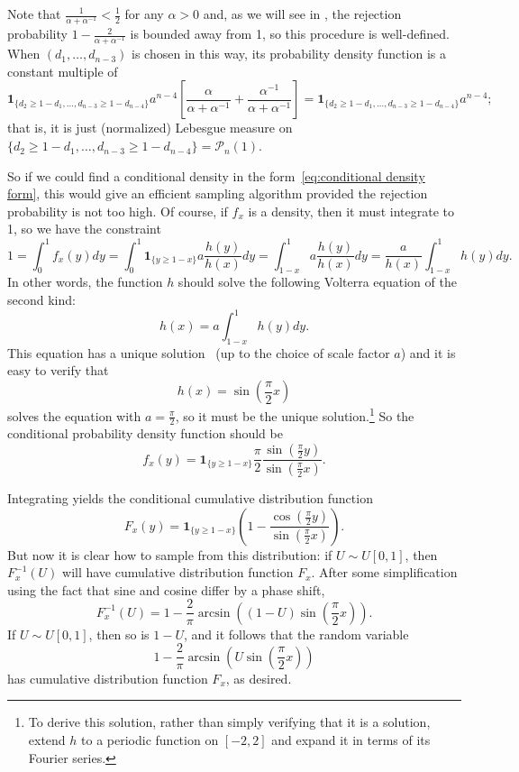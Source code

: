 \documentclass{article}
\theoremstyle{definition}
\newcommand{\one}{\mathbf{1}}
\begin{document}
Note that $\frac{1}{\alpha + \alpha^{-1}} < \frac{1}{2}$ for any $\alpha > 0$ and, as we will see in , the rejection probability $1-\frac{2}{\alpha + \alpha^{-1}}$ is bounded away from 1, so this procedure is well-defined. When $(d_1, \dots, d_{n-3})$ is chosen in this way, its probability density function is a constant multiple of
\[
	\one_{\{d_2 \geq 1-d_1,  \dots, d_{n-3} \geq 1-d_{n-4}\}} a^{n-4} \left[ \frac{\alpha}{\alpha + \alpha^{-1}} + \frac{\alpha^{-1}}{\alpha + \alpha^{-1}} \right] = \one_{\{d_2 \geq 1-d_1,  \dots, d_{n-3} \geq 1-d_{n-4}\}} a^{n-4} ;
\]
that is, it is just (normalized) Lebesgue measure on $\{d_2 \geq 1-d_1,  \dots, d_{n-3} \geq 1-d_{n-4}\} = \mathcal{P}_n(1)$.

So if we could find a conditional density in the form~\eqref{eq:conditional density form}, this would give an efficient sampling algorithm provided the rejection probability is not too high. Of course, if $f_x$ is a density, then it must integrate to 1, so we have the constraint
\[
	1 = \int_0^1 f_x(y) dy = \int_0^1 \one_{\{y \geq 1-x\}} a \frac{h(y)}{h(x)} dy = \int_{1-x}^1 a \frac{h(y)}{h(x)} dy = \frac{a}{h(x)} \int_{1-x}^1 h(y) dy.
\]
In other words, the function $h$ should solve the following Volterra equation of the second kind:
\[
	h(x) = a \int_{1-x}^1 h(y) dy.
\]
This equation has a unique solution~\cite{brunnerCollocationMethodsVolterra2004} (up to the choice of scale factor $a$) and it is easy to verify that
\[
	h(x) = \sin \left( \frac{\pi}{2} x\right)
\]
solves the equation with $a=\frac{\pi}{2}$, so it must be the unique solution.\footnote{To derive this solution, rather than simply verifying that it is a solution, extend $h$ to a periodic function on $[-2,2]$ and expand it in terms of its Fourier series.} So the conditional probability density function should be
\begin{equation}\label{eq:conditional density}
	f_x(y) = \one_{\{y \geq 1-x\}}\frac{\pi}{2} \frac{\sin\left(\frac{\pi}{2}y \right)}{\sin\left(\frac{\pi}{2} x\right)}.
\end{equation}

Integrating yields the conditional cumulative distribution function
\[
	F_x(y) = \one_{\{y \geq 1-x\}}\left( 1- \frac{\cos\left(\frac{\pi}{2}y \right)}{\sin\left(\frac{\pi}{2} x\right)}\right).
\]
But now it is clear how to sample from this distribution: if $U \sim U[0,1]$, then $F_x^{-1}(U)$ will have cumulative distribution function $F_x$. After some simplification using the fact that sine and cosine differ by a phase shift, 
\[
	F_x^{-1}(U) = 1-\frac{2}{\pi}\arcsin\left((1-U) \sin \left(\frac{\pi}{2}x\right)\right).
\]
If $U\sim U[0,1]$, then so is $1-U$, and it follows that the random variable 
\[
	1-\frac{2}{\pi}\arcsin\left(U\sin \left(\frac{\pi}{2}x\right)\right)
\]
has cumulative distribution function $F_x$, as desired.
\end{document}
